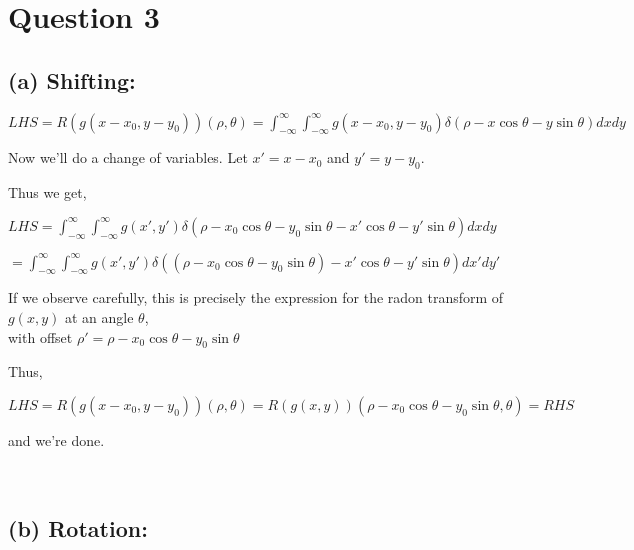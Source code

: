 \documentclass[fleqn, 11pt]{article}
\begin{document}
\newpage
\section*{Question 3}
\setcounter{equation}{0}

\subsection*{(a) Shifting:}

$LHS 
= R(g(x-x_0,y-y_0))(\rho, \theta)
= \displaystyle \int_{-\infty }^{\infty} \int_{-\infty }^{\infty}  g(x-x_0,y-y_0) \delta (\rho - x \cos \theta - y \sin \theta) dx dy
$

 \smallskip 

Now we'll do a change of variables. Let $x'=x-x_0$ and $y'=y-y_0$.

 \medskip 

Thus we get,

 \smallskip 

$LHS 
= \displaystyle \int_{-\infty }^{\infty} \int_{-\infty }^{\infty}  g(x',y') \delta (\rho - x_0 \cos \theta - y_0 \sin \theta - x' \cos \theta - y' \sin \theta) dx dy 
$

 \smallskip 

$
= \displaystyle \int_{-\infty }^{\infty} \int_{-\infty }^{\infty}  g(x',y') \delta ( (\rho - x_0 \cos \theta - y_0 \sin \theta) - x' \cos \theta - y' \sin \theta) dx' dy'
$

 \medskip 

If we observe carefully, this is precisely the expression for the radon transform of $g(x,y)$ 
at an angle $\theta$, \\ with offset  
$\rho' = \rho - x_0 \cos \theta - y_0 \sin \theta$ 

 \medskip 

Thus, 

 \smallskip 

$
LHS
=R(g(x-x_0,y-y_0))(\rho, \theta)
= R(g(x,y))(\rho - x_0 \cos \theta - y_0 \sin \theta, \theta) 
=RHS
$

and we're done.

~\\

\hrulefill 


\subsection*{(b) Rotation:}
\end{document}
